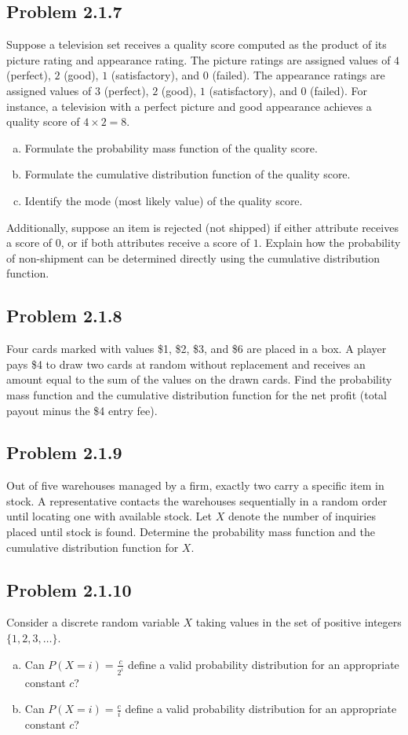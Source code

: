 \documentclass{article}
\begin{document}
\subsection*{Problem 2.1.7}
Suppose a television set receives a quality score computed as the product of its picture rating and appearance rating. The picture ratings are assigned values of $4$ (perfect), $2$ (good), $1$ (satisfactory), and $0$ (failed). The appearance ratings are assigned values of $3$ (perfect), $2$ (good), $1$ (satisfactory), and $0$ (failed). For instance, a television with a perfect picture and good appearance achieves a quality score of $4 \times 2 = 8$.
\begin{enumerate}[(a)]
    \item Formulate the probability mass function of the quality score.
    \item Formulate the cumulative distribution function of the quality score.
    \item Identify the mode (most likely value) of the quality score.
\end{enumerate}
Additionally, suppose an item is rejected (not shipped) if either attribute receives a score of $0$, or if both attributes receive a score of $1$. Explain how the probability of non-shipment can be determined directly using the cumulative distribution function.

\subsection*{Problem 2.1.8}
Four cards marked with values \$1, \$2, \$3, and \$6 are placed in a box. A player pays \$4 to draw two cards at random without replacement and receives an amount equal to the sum of the values on the drawn cards. Find the probability mass function and the cumulative distribution function for the net profit (total payout minus the \$4 entry fee).

\subsection*{Problem 2.1.9}
Out of five warehouses managed by a firm, exactly two carry a specific item in stock. A representative contacts the warehouses sequentially in a random order until locating one with available stock. Let $X$ denote the number of inquiries placed until stock is found. Determine the probability mass function and the cumulative distribution function for $X$.

\subsection*{Problem 2.1.10}
Consider a discrete random variable $X$ taking values in the set of positive integers $\{1, 2, 3, \dots\}$.
\begin{enumerate}[(a)]
    \item Can $P(X = i) = \frac{c}{2^i}$ define a valid probability distribution for an appropriate constant $c$?
    \item Can $P(X = i) = \frac{c}{i}$ define a valid probability distribution for an appropriate constant $c$?
\end{enumerate}
\end{document}
